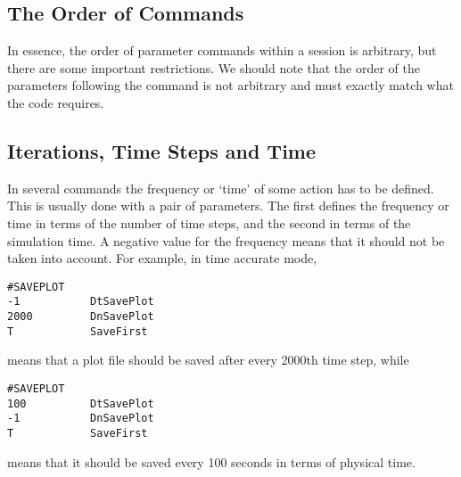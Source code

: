 \subsection{The Order of Commands \label{section:order}}

In essence, the order of parameter commands within a
session is arbitrary, but there are some important restrictions.  
We should note that the order of the parameters following 
the command is not arbitrary and must exactly match what the code requires.  

\subsection{Iterations, Time Steps and Time \label{section:frequency}}

In several commands the frequency or `time' of some action has
to be defined. This is usually done with a pair of parameters.
The first defines the frequency or time in terms of the number of time steps,
and the second in terms of the simulation time.
A negative value for the frequency means that it should not be taken 
into account. For example, in time accurate mode,
\begin{verbatim}
#SAVEPLOT                                                                                           
-1           DtSavePlot
2000         DnSavePlot
T            SaveFirst
\end{verbatim}
means that a plot file should be saved after every 2000th time step, while
\begin{verbatim}
#SAVEPLOT
100          DtSavePlot
-1           DnSavePlot
T            SaveFirst
\end{verbatim}
means that it should be saved every 100 seconds in terms of physical time.




